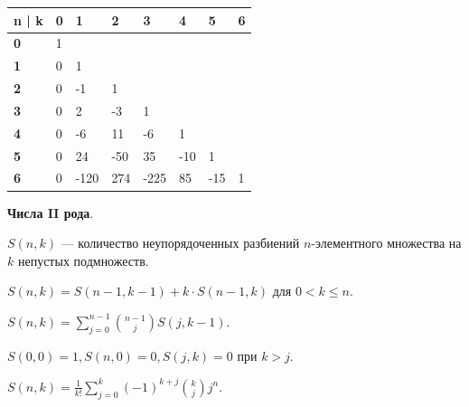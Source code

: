 \begin{center}
    \begin{tabular}{|l|l|l|l|l|l|l|l|} \hline
        n | k      & \textbf{0} & \textbf{1} & \textbf{2} & \textbf{3} & \textbf{4} & \textbf{5} & \textbf{6} \\ \hline
        \textbf{0} & 1          &            &            &            &            &            &            \\ \hline
        \textbf{1} & 0          & 1          &            &            &            &            &            \\ \hline
        \textbf{2} & 0          & -1         & 1          &            &            &            &            \\ \hline
        \textbf{3} & 0          & 2          & -3         & 1          &            &            &            \\ \hline
        \textbf{4} & 0          & -6         & 11         & -6         & 1          &            &            \\ \hline
        \textbf{5} & 0          & 24         & -50        & 35         & -10        & 1          &            \\ \hline
        \textbf{6} & 0          & -120       & 274        & -225       & 85         & -15        & 1          \\ \hline
    \end{tabular}
\end{center}

\textbf{Числа II рода}.

$S(n,k)$ --- количество неупорядоченных разбиений $n$-элементного множества на $k$ непустых подмножеств.

$S(n,k) = S(n - 1, k - 1) + k \cdot S(n-1,k)$ для $0 < k \le n$.

$S(n,k) = \sum_{j=0}^{n-1} \binom{n-1}{j}S(j, k-1)$.

$S(0,0) = 1, S(n,0)=0, S(j,k)=0$ при $k>j$.

$S(n, k) = \frac{1}{k!} \sum_{j=0}^k (-1)^{k+j} \binom{k}{j} j ^ n$.

